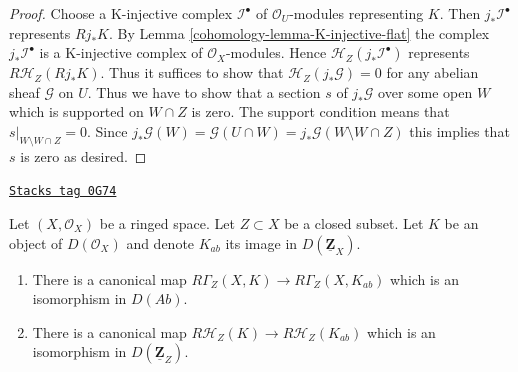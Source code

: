 \begin{proof}

Choose a K-injective complex $\mathcal{I}^\bullet$ of $\mathcal{O}_U$-modules
representing $K$. Then $j_*\mathcal{I}^\bullet$ represents $Rj_*K$. By
Lemma \ref{cohomology-lemma-K-injective-flat} the complex $j_*\mathcal{I}^\bullet$ is a
K-injective complex of $\mathcal{O}_X$-modules. Hence
$\mathcal{H}_Z(j_*\mathcal{I}^\bullet)$ represents $R\mathcal{H}_Z(Rj_*K)$.
Thus it suffices to show that $\mathcal{H}_Z(j_*\mathcal{G}) = 0$
for any abelian sheaf $\mathcal{G}$ on $U$. Thus we have to show that
a section $s$ of $j_*\mathcal{G}$ over some open $W$ which is supported
on $W \cap Z$ is zero. The support condition means that
$s|_{W \setminus W \cap Z} = 0$. Since $j_*\mathcal{G}(W) =
\mathcal{G}(U \cap W) = j_*\mathcal{G}(W \setminus W \cap Z)$
this implies that $s$ is zero as desired.
\end{proof}

\begin{lemma}
\label{cohomology-lemma-sections-support-abelian-unbounded}
\href{https://stacks.math.columbia.edu/tag/0G74}{\texttt{Stacks tag 0G74}}

Let $(X, \mathcal{O}_X)$ be a ringed space. Let $Z \subset X$
be a closed subset. Let $K$ be an object of $D(\mathcal{O}_X)$
and denote $K_{ab}$ its image in $D(\underline{\mathbf{Z}}_X)$.
\begin{enumerate}
\item There is a canonical map $R\Gamma_Z(X, K) \to R\Gamma_Z(X, K_{ab})$
which is an isomorphism in $D(\textit{Ab})$.
\item There is a canonical map
$R\mathcal{H}_Z(K) \to R\mathcal{H}_Z(K_{ab})$
which is an isomorphism in $D(\underline{\mathbf{Z}}_Z)$.
\end{enumerate}
\end{lemma}

